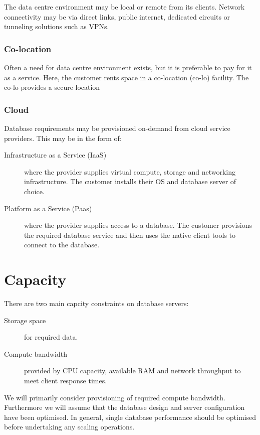 The data centre environment may be local or remote from its clients.
Network connectivity may be via direct links, public internet, dedicated circuits or tunneling solutions such as VPNs. 


\subsubsection{Co-location}

Often a need for data centre environment exists, but it is preferable to pay for it as a service.
Here, the customer rents space in a co-location (co-lo) facility.
The co-lo provides a secure location 

\subsubsection{Cloud}

Database requirements may be provisioned on-demand from cloud service providers.
This may be in the form of:
\begin{description}
\item[Infrastructure as a Service (IaaS)] where the provider supplies virtual compute, storage and networking infrastructure.
  The customer installs their OS and database server of choice. 
\item[Platform as a Service (Paas)] where the provider supplies access to a database.
  The customer provisions the required database service and then uses the native client tools to connect to the database. 
\end{description}



\section{Capacity}

There are two main capcity constraints on database servers:
\begin{description}
\item[Storage space] for required data.
\item[Compute bandwidth] provided by CPU capacity, available RAM and network throughput to meet client response times.
\end{description}
We will primarily consider provisioning of required compute bandwidth.
Furthermore we will assume that the database design and server configuration have been optimised.
In general, single database performance should be optimised before undertaking any scaling operations. 


